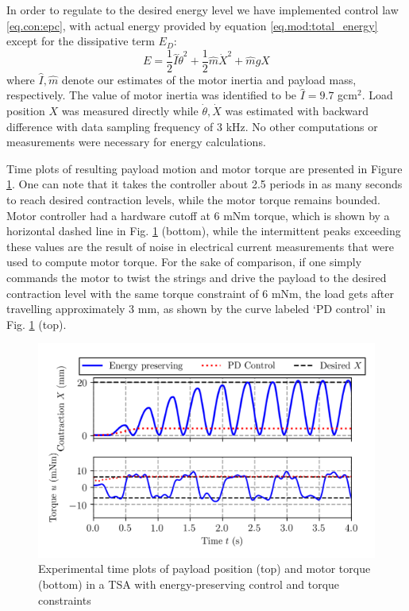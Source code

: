 In order to regulate to the desired energy level we have implemented control law \eqref{eq.con:epc}, with actual energy provided by equation \eqref{eq.mod:total_energy} except for the dissipative term $E_D$: 
\begin{equation}\label{eq.con:total_energy}
    E = \frac{1}{2} \hat{I}\dot{\theta}^2 + \frac{1}{2}\hat{m} \dot{X}^2 + \hat{m}gX
\end{equation}
where $\hat{I}, \hat{m}$ denote our estimates of the motor inertia and payload mass, respectively. The value of motor inertia was identified to be $\hat{I}=9.7$ gcm$^2$. 
Load position $X$ was measured directly while $\dot{\theta},\dot{X}$ was estimated with backward difference with data sampling frequency of 3 kHz. No other computations or measurements were necessary for energy calculations.

Time plots of resulting payload motion and motor torque are presented in Figure \ref{fig:time_plots_X_torque_epc}. One can note that it takes the controller about 2.5 periods in as many seconds to reach desired contraction levels, while the motor torque remains bounded. Motor controller had a hardware cutoff at 6 mNm torque, which is shown by a horizontal dashed line in  Fig. \ref{fig:time_plots_X_torque_epc} (bottom), while the intermittent peaks exceeding these values are the result of noise in electrical current measurements that were used to compute motor torque.
For the sake of comparison, if one simply commands the motor to twist the strings and drive the payload to the desired contraction level with the same torque constraint of 6 mNm, the load gets after travelling approximately 3 mm, as shown by the curve labeled `PD control' in Fig. \ref{fig:time_plots_X_torque_epc} (top). 

\begin{figure}
		\centering
		\includegraphics[trim= 0.0cm 0.8cm 0.0cm 0.0cm,width=1.0\columnwidth]{pics/plots/control_comparison.png}
		\caption{Experimental time plots of payload position (top) and motor torque (bottom) in a TSA with energy-preserving control and torque constraints}
 		\label{fig:time_plots_X_torque_epc}
		\vspace*{-2mm} 
\end{figure}


